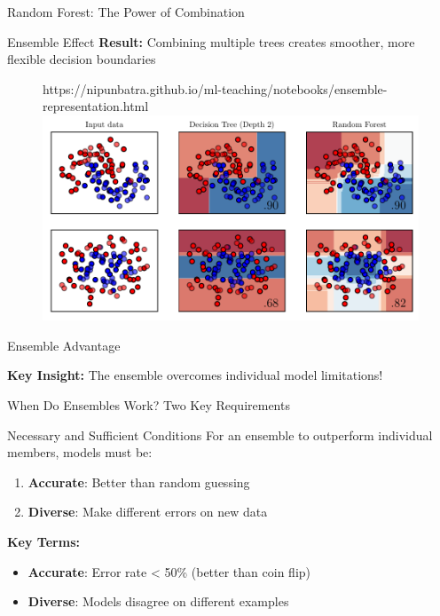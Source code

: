 \documentclass[10pt]{beamer}
\newcommand{\fitpic}[1]{\begin{adjustbox}{max width=\linewidth, max totalheight=0.78\textheight}#1\end{adjustbox}}
\begin{document}
\begin{frame}{Random Forest: The Power of Combination}
\begin{examplebox}{Ensemble Effect}
\textbf{Result:} Combining multiple trees creates smoother, more flexible decision boundaries
\end{examplebox}

  \begin{figure}[htp]
    \centering
    \begin{notebookbox}{https://nipunbatra.github.io/ml-teaching/notebooks/ensemble-representation.html}
      \fitpic{\includegraphics[scale=0.5]{../assets/ensemble/figures/2-representation.pdf}}
    \end{notebookbox}
  \end{figure}
\end{frame}
  
\begin{frame}{Ensemble Advantage}
\begin{keypointsbox}
\textbf{Key Insight:} The ensemble overcomes individual model limitations!
\end{keypointsbox}
\end{frame}




\begin{frame}{When Do Ensembles Work? Two Key Requirements}
\begin{definitionbox}{Necessary and Sufficient Conditions}
For an ensemble to outperform individual members, models must be:
\begin{enumerate}
\item \textbf{Accurate}: Better than random guessing
\item \textbf{Diverse}: Make different errors on new data
\end{enumerate}
\end{definitionbox}

\begin{keypointsbox}
\textbf{Key Terms:}
\begin{itemize}
\item \textbf{Accurate}: Error rate < 50\% (better than coin flip)
\item \textbf{Diverse}: Models disagree on different examples
\end{itemize}
\end{keypointsbox}
\end{frame}
\end{document}

